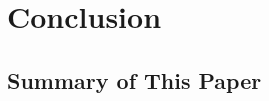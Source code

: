 \documentclass[a4paper]{article}
\begin{document}
\section{Conclusion} 
\subsection{Summary of This Paper} 






 

\newpage


\end{document}

